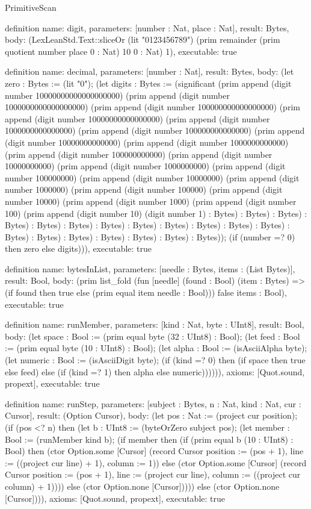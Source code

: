 \begin{lexlean}{PrimitiveScan}
\begin{semanticmodule}
definition{
  name: digit,
  parameters: [number : Nat, place : Nat],
  result: Bytes,
  body: (LexLeanStd.Text::sliceOr (lit "0123456789") (prim remainder (prim quotient number place 0 : Nat) 10 0 : Nat) 1),
  executable: true
}

definition{
  name: decimal,
  parameters: [number : Nat],
  result: Bytes,
  body: (let zero : Bytes := (lit "0"); (let digits : Bytes := (significant (prim append (digit number 10000000000000000000) (prim append (digit number 1000000000000000000) (prim append (digit number 100000000000000000) (prim append (digit number 10000000000000000) (prim append (digit number 1000000000000000) (prim append (digit number 100000000000000) (prim append (digit number 10000000000000) (prim append (digit number 1000000000000) (prim append (digit number 100000000000) (prim append (digit number 10000000000) (prim append (digit number 1000000000) (prim append (digit number 100000000) (prim append (digit number 10000000) (prim append (digit number 1000000) (prim append (digit number 100000) (prim append (digit number 10000) (prim append (digit number 1000) (prim append (digit number 100) (prim append (digit number 10) (digit number 1) : Bytes) : Bytes) : Bytes) : Bytes) : Bytes) : Bytes) : Bytes) : Bytes) : Bytes) : Bytes) : Bytes) : Bytes) : Bytes) : Bytes) : Bytes) : Bytes) : Bytes) : Bytes) : Bytes)); (if (number =? 0) then zero else digits))),
  executable: true
}

definition{
  name: bytesInList,
  parameters: [needle : Bytes, items : (List Bytes)],
  result: Bool,
  body: (prim list_fold (fun [needle] (found : Bool) (item : Bytes) => (if found then true else (prim equal item needle : Bool))) false items : Bool),
  executable: true
}

definition{
  name: runMember,
  parameters: [kind : Nat, byte : UInt8],
  result: Bool,
  body: (let space : Bool := (prim equal byte (32 : UInt8) : Bool); (let feed : Bool := (prim equal byte (10 : UInt8) : Bool); (let alpha : Bool := (isAsciiAlpha byte); (let numeric : Bool := (isAsciiDigit byte); (if (kind =? 0) then (if space then true else feed) else (if (kind =? 1) then alpha else numeric)))))),
  axioms: [Quot.sound, propext],
  executable: true
}

definition{
  name: runStep,
  parameters: [subject : Bytes, n : Nat, kind : Nat, cur : Cursor],
  result: (Option Cursor),
  body: (let pos : Nat := (project cur position); (if (pos <? n) then (let b : UInt8 := (byteOrZero subject pos); (let member : Bool := (runMember kind b); (if member then (if (prim equal b (10 : UInt8) : Bool) then (ctor Option.some [Cursor] (record Cursor {position := (pos + 1), line := ((project cur line) + 1), column := 1})) else (ctor Option.some [Cursor] (record Cursor {position := (pos + 1), line := (project cur line), column := ((project cur column) + 1)}))) else (ctor Option.none [Cursor])))) else (ctor Option.none [Cursor]))),
  axioms: [Quot.sound, propext],
  executable: true
}


\end{semanticmodule}
\end{lexlean}
